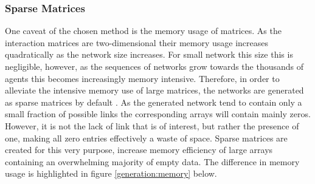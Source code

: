 \documentclass{article}
\begin{document}
\newpage

\subsubsection{Sparse Matrices}

One caveat of the chosen method is the memory usage of matrices. As the interaction matrices are two-dimensional their memory usage increases quadratically as the network size increases. For small network this size this is negligible, however, as the sequences of networks grow towards the thousands of agents this becomes increasingly memory intensive. Therefore, in order to alleviate the intensive memory use of large matrices, the networks are generated as sparse matrices by default \cite{2020SciPy-NMeth}. As the generated network tend to contain only a small fraction of possible links the corresponding arrays will contain mainly zeros. However, it is not the lack of link that is of interest, but rather the presence of one, making all zero entries effectively a waste of space. Sparse matrices are created for this very purpose, increase memory efficiency of large arrays containing an overwhelming majority of empty data. The difference in memory usage is highlighted in figure \ref{generation:memory} below.
\end{document}
